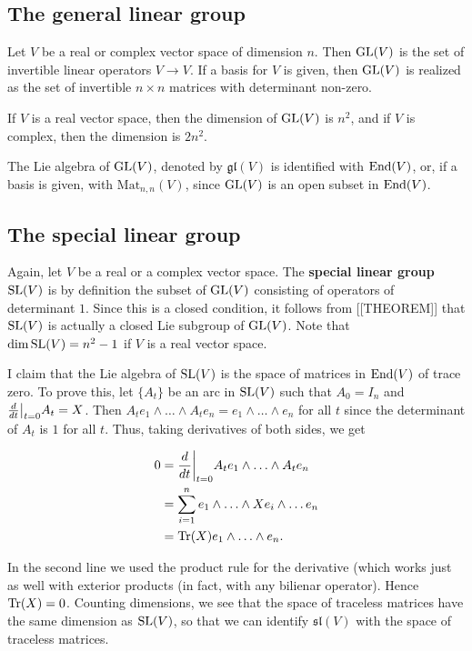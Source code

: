 \documentclass[11pt, english]{article}
\begin{document}
\subsection{The general linear group}

Let $V$ be a real or complex vector space of dimension $n$. Then $\operatorname{GL}(V)$ is the set of invertible linear operators $V \to V$. If a basis for $V$ is given, then $\operatorname{GL}(V)$ is realized as the set of invertible $n \times n$ matrices with determinant non-zero.

If $V$ is a real vector space, then the dimension of $\operatorname{GL}(V)$ is $n^2$, and if $V$ is complex, then the dimension is $2n^2$. 

The Lie algebra of $\operatorname{GL}(V)$, denoted by $\mathfrak {gl}(V)$ is identified with $\operatorname{End}(V)$, or, if a basis is given, with $\mathrm{Mat}_{n,n}(V)$, since $\operatorname{GL}(V)$ is an open subset in $\operatorname{End}(V)$.

\subsection{The special linear group}

Again, let $V$ be a real or a complex vector space. The \textbf{special linear group} $\operatorname{SL}(V)$ is by definition the subset of $\operatorname{GL}(V)$ consisting of operators of determinant $1$. Since this is a closed condition, it follows from [[THEOREM]] that $\operatorname{SL}(V)$ is actually a closed Lie subgroup of $\operatorname{GL}(V)$. Note that $\dim \operatorname{SL}(V) = n^2-1$ if $V$ is a real vector space.

I claim that the Lie algebra of $\operatorname{SL}(V)$ is the space of matrices in $\operatorname{End}(V)$ of trace zero. To prove this, let $\{ A_t \}$ be an arc in $\operatorname{SL}(V)$ such that $A_0 = I_n$ and $\restr{\frac{d}{dt}}{t=0} A_t =X$. Then $A_t e_1 \wedge \ldots  \wedge A_t e_n = e_1 \wedge \ldots \wedge e_n$ for all $t$ since the determinant of $A_t$ is $1$ for all $t$. Thus, taking derivatives of both sides, we get

\begin{align*}
0 &= \restr{ \frac{d}{dt}}{t=0} A_t e_1 \wedge \ldots \wedge A_t e_n \\
&= \sum_{i=1}^n e_1 \wedge \ldots \wedge X e_i \wedge \ldots e_n \\
&= \tr(X) e_1 \wedge \ldots \wedge e_n.
\end{align*}

In the second line we used the product rule for the derivative (which works just as well with exterior products (in fact, with any bilienar operator). Hence $\operatorname{Tr}(X)=0$. Counting dimensions, we see that the space of traceless matrices have the same dimension as $\operatorname{SL}(V)$, so that we can identify $\mathfrak{sl}(V)$ with the space of traceless matrices.
\end{document}
